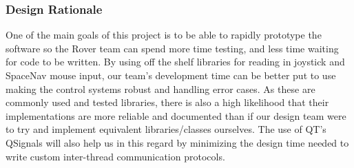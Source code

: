 \subsubsection{Design Rationale}
One of the main goals of this project is to be able to rapidly prototype the software so the Rover team can spend more time testing, and less time waiting for code to be written.
By using off the shelf libraries for reading in joystick and SpaceNav mouse input, our team's development time can be better put to use making the control systems robust and handling error cases.
As these are commonly used and tested libraries, there is also a high likelihood that their implementations are more reliable and documented than if our design team were to try and implement equivalent libraries/classes ourselves.
The use of QT's QSignals will also help us in this regard by minimizing the design time needed to write custom inter-thread communication protocols. 